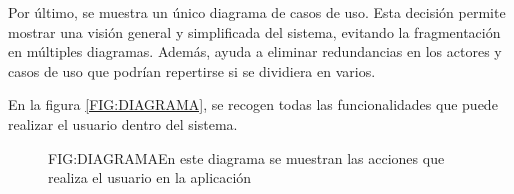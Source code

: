 Por último, se muestra un único diagrama de casos de uso. Esta decisión permite mostrar una visión general y 
simplificada del sistema, evitando la fragmentación en múltiples diagramas. Además, ayuda a eliminar redundancias
en los actores y casos de uso que podrían repertirse si se dividiera en varios. 

En la figura \ref{FIG:DIAGRAMA}, se recogen todas las funcionalidades que puede realizar el usuario dentro del sistema.

\begin{figure}[Diagrama de caso de uso]{FIG:DIAGRAMA}{En este diagrama se muestran las acciones que realiza el usuario en la aplicación }
\end{figure}